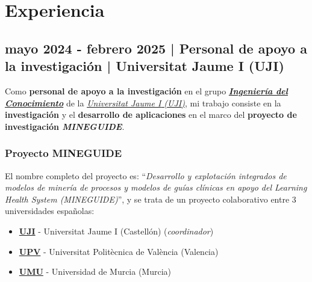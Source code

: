 \documentclass[letterpaper, 12pt, dvipsnames]{article}
\newcommand{\upvName}{Universitat Politècnica de València}
\newcommand{\upv}{UPV}
\newcommand{\upvUrl}{https://www.upv.es/es}
\newcommand{\ujiFull}{{\ujiName} ({\uji})}
\newcommand{\ujiName}{Universitat Jaume I}
\newcommand{\uji}{UJI}
\newcommand{\ujiUrl}{https://www.uji.es/upo/rest/publicacion/idioma/es?urlRedirect=https://www.uji.es/&url=/}
\newcommand{\ujiGroup}{Ingeniería del Conocimiento}
\newcommand{\ujiGroupUrl}{https://www.uji.es/upo/rest/publicacion/idioma/es?urlRedirect=https://www.uji.es/serveis/ocit/base/grupsinvestigacio/detall/&url=/serveis/ocit/base/grupsinvestigacio/detall&codi=158}
\begin{document}
\begin{adjustwidth}{-1.5cm}{}
\end{adjustwidth}

\pagebreak

\section*{Experiencia}

\subsection*{mayo 2024 - febrero 2025 | Personal de apoyo a la investigación | {\ujiFull}}

Como \textbf{personal de apoyo a la investigación} en el grupo \emph{\textbf{\href{\ujiGroupUrl}{\ujiGroup}}} de la \emph{\href{\ujiUrl}{\ujiFull}}, mi trabajo consiste en la \textbf{investigación} y el \textbf{desarrollo de aplicaciones} en el marco del \textbf{proyecto de investigación \emph{MINEGUIDE}}.

\subsubsection*{Proyecto MINEGUIDE}

El nombre completo del proyecto es: ``\emph{Desarrollo y explotación integrados de modelos de minería de procesos y modelos de guías clínicas en apoyo del Learning Health System (MINEGUIDE)}'', y se trata de un proyecto colaborativo entre 3 universidades españolas:
\begin{itemize}
    \item \textbf{\href{\ujiUrl}{\uji}} - {\ujiName} (Castellón) (\emph{coordinador})
    \item \textbf{\href{\upvUrl}{\upv}} - {\upvName} (Valencia)
    \item \textbf{\href{https://www.um.es/}{UMU}} - Universidad de Murcia (Murcia) 
\end{itemize}
\end{document}
